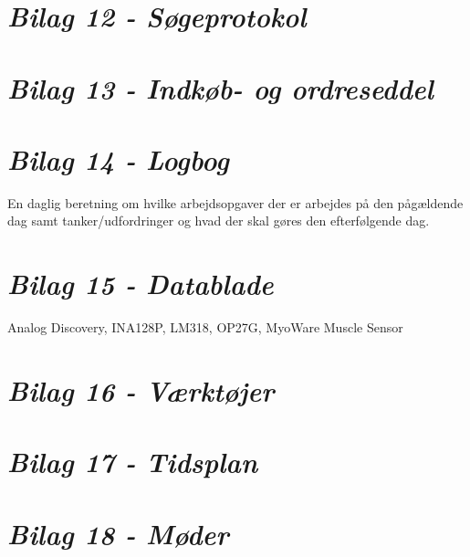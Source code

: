 \section*{\textit{Bilag 12 - Søgeprotokol}} \label{bilag12}
\section*{\textit{Bilag 13 - Indkøb- og ordreseddel}} \label{bilag13}
\section*{\textit{Bilag 14 - Logbog}} \label{bilag14}
En daglig beretning om hvilke arbejdsopgaver der er arbejdes på den pågældende dag samt tanker/udfordringer og hvad der skal gøres den efterfølgende dag.
\section*{\textit{Bilag 15 - Datablade}} \label{bilag15}
Analog Discovery, INA128P, LM318, OP27G, MyoWare Muscle Sensor
\section*{\textit{Bilag 16 - Værktøjer}} \label{bilag16}
\section*{\textit{Bilag 17 - Tidsplan}} \label{bilag17}
\section*{\textit{Bilag 18 - Møder}} \label{bilag18}






